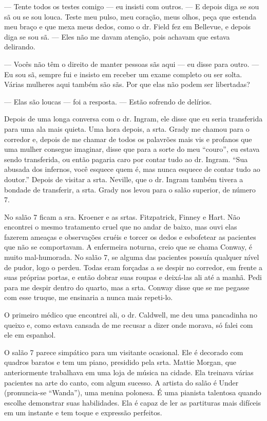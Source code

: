 --- Tente todos os testes comigo --- eu insisti com outros. 
--- E depois diga se sou sã ou se sou louca. Teste meu pulso, meu
coração, meus olhos, peça que estenda meu braço e que mexa meus dedos,
como o dr. Field fez em Bellevue, e depois diga se sou sã. --- Eles não me
davam atenção, pois achavam que estava delirando.

--- Vocês não têm o direito de manter pessoas sãs aqui --- eu disse para
outro. --- Eu sou sã, sempre fui e insisto em receber um exame completo
ou ser solta. Várias mulheres aqui também são sãs. Por que elas não
podem ser libertadas?

--- Elas são loucas --- foi a resposta. --- Estão sofrendo de delírios.

Depois de uma longa conversa com o dr. Ingram, ele disse que eu seria
transferida para uma ala mais quieta. Uma hora depois, a srta. Grady me
chamou para o corredor e, depois de me chamar de todos os palavrões mais
vis e profanos que uma mulher consegue imaginar, disse que para a sorte
do meu ``couro'', eu estava sendo transferida, ou então pagaria caro por
contar tudo ao dr. Ingram. ``Sua abusada dos infernos, você esquece
quem é, mas nunca esquece de contar tudo ao doutor.'' Depois de visitar
a srta. Neville, que o dr. Ingram também tivera a bondade de transferir,
a srta. Grady nos levou para o salão superior, de número 7.


No salão 7 ficam a sra. Kroener e as srtas. Fitzpatrick, Finney e Hart. Não
encontrei o mesmo tratamento cruel que no andar de baixo, mas ouvi elas
fazerem ameaças e observações cruéis e torcer os dedos e esbofetear as
pacientes que não se comportavam. A enfermeira noturna, creio que se
chama Conway, é muito mal-humorada. No salão 7, se alguma das pacientes
possuía qualquer nível de pudor, logo o perdeu. Todas eram forçadas a
se despir no corredor, em frente a suas próprias portas, e então dobrar
suas roupas e deixá-las ali até a manhã. Pedi para me despir dentro do
quarto, mas a srta. Conway disse que se me pegasse com esse truque, me
ensinaria a nunca mais repeti-lo.

O primeiro médico que encontrei ali, o dr. Caldwell, me deu uma
pancadinha no queixo e, como estava cansada de me recusar a dizer onde
morava, só falei com ele em espanhol.

O salão 7 parece simpático para um visitante ocasional. Ele é decorado
com quadros baratos e tem um piano, presidido pela srta. Mattie Morgan,
que anteriormente trabalhava em uma loja de música na cidade. Ela
treinava várias pacientes na arte do canto, com algum sucesso. A artista
do salão é Under (pronuncia-se ``Wanda''), uma menina polonesa. É uma
pianista talentosa quando escolhe demonstrar suas habilidades. Ela é
capaz de ler as partituras mais difíceis em um instante e tem toque e
expressão perfeitos.

